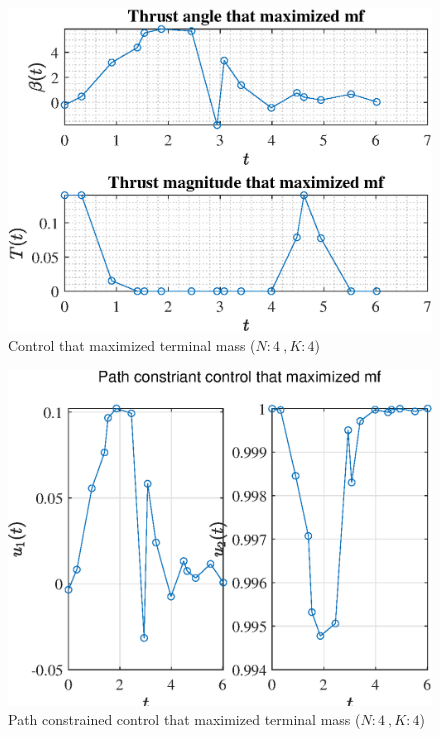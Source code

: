 \documentclass[]{article}
\begin{document}
	\begin{figure}
		\centering
		\includegraphics[scale=0.75]{control_N4_K4_C3_mf.eps}
		\caption{Control that maximized terminal mass (\(N:4\ , K:4\))}
		\label{fig:control_N4_K4_C3_mf}
	\end{figure}
	\begin{figure}
		\centering
		\includegraphics[scale=0.75]{path_N4_K4_C3_mf.eps}
		\caption{Path constrained control that maximized terminal mass (\(N:4\ , K:4\))}
		\label{fig:path_N4_K4_C3_mf}
	\end{figure}
\end{document}
